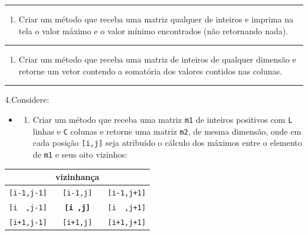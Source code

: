\documentclass[12pt,a4paper]{article}
\providecommand{\tightlist}{%
      \setlength{\itemsep}{0pt}\setlength{\parskip}{0pt}}
\begin{document}
    \begin{center}\rule{0.5\linewidth}{0.5pt}\end{center}

\begin{enumerate}
\def\labelenumi{\arabic{enumi}.}
\setcounter{enumi}{1}
\tightlist
\item
  Criar um método que receba uma matriz qualquer de inteiros e imprima
  na tela o valor máximo e o valor mínimo encontrados (não retornando
  nada).
\end{enumerate}

    \begin{center}\rule{0.5\linewidth}{0.5pt}\end{center}

\begin{enumerate}
\def\labelenumi{\arabic{enumi}.}
\setcounter{enumi}{2}
\tightlist
\item
  Criar um método que receba uma matriz de inteiros de qualquer dimensão
  e retorne um vetor contendo a somatória dos valores contidos nas
  colunas.
\end{enumerate}

    \begin{center}\rule{0.5\linewidth}{0.5pt}\end{center}

4.Considere:

\begin{itemize}
\item
  \begin{enumerate}
  \def\labelenumi{\alph{enumi})}
  \tightlist
  \item
    Criar um método que receba uma matriz \texttt{m1} de inteiros
    positivos com \texttt{L} linhas e \texttt{C} colunas e retorne uma
    matriz \texttt{m2}, de mesma dimensão, onde em cada posição
    \texttt{{[}i,j{]}} seja atribuído o cálculo dos máximos entre o
    elemento de \texttt{m1} e seus oito vizinhos:
  \end{enumerate}
\end{itemize}

\begin{longtable}[]{@{}ccc@{}}
\toprule
& vizinhança &\tabularnewline
\midrule
\endhead
\texttt{{[}i-1,j-1{]}} & \texttt{{[}i-1,j{]}} &
\texttt{{[}i-1,j+1{]}}\tabularnewline
\texttt{{[}i\ \ ,j-1{]}} & \textbf{\texttt{{[}i\ ,j{]}}} &
\texttt{{[}i\ \ ,j+1{]}}\tabularnewline
\texttt{{[}i+1,j-1{]}} & \texttt{{[}i+1,j{]}} &
\texttt{{[}i+1,j+1{]}}\tabularnewline
\bottomrule
\end{longtable}
\end{document}
